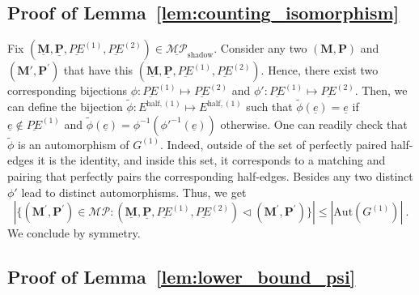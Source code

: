 \documentclass{article}
\begin{document}
\subsection{Proof of Lemma~\ref{lem:counting_isomorphism}}
    Fix  $(\underline{\mathbf{M}}, \underline{\mathbf{P}}, \underline{PE}^{(1)},\underline{PE}^{(2)})\in \underline{\mathcal{M}\mathcal{P}}_{\mathrm{shadow}}$. Consider any two $(\mathbf{M},\mathbf{P})$ and $(\mathbf{M}',\mathbf{P}^{'})$ that have this $(\underline{\mathbf{M}}, \underline{\mathbf{P}}, \underline{PE}^{(1)},\underline{PE}^{(2)})$. 
    Hence, there exist two corresponding bijections $\phi:\underline{PE}^{(1)}\mapsto \underline{PE}^{(2)} $ and $\phi':\underline{PE}^{(1)}\mapsto \underline{PE}^{(2)}$. Then, we can define the bijection $\tilde{\phi}: E^{\mathrm{\mathrm{half}},(1)}\mapsto E^{\mathrm{\mathrm{half}},(1)}$  such that $\tilde{\phi}(\underline{e})= \underline{e}$ if $\underline{e}\notin \underline{PE}^{(1)}$ and $\tilde{\phi}(\underline{e})= \phi^{-1}(\phi'^{-1}(\underline{e}))$ otherwise. One can readily check that $\tilde{\phi}$ is an automorphism of $G^{(1)}$. Indeed, outside of the set of perfectly paired half-edges it is the identity, and inside this set, it corresponds to a matching and pairing that perfectly pairs the corresponding half-edges. 
    Besides any two distinct $\phi'$ lead to distinct automorphisms. Thus, we get
    \[
        \left|\Big\{(\mathbf{M}^{'},\mathbf{P}^{'})\in \mathcal{M}\mathcal{P} :  (\underline{\mathbf{M}}, \underline{\mathbf{P}}, \underline{PE}^{(1)},\underline{PE}^{(2)})\triangleleft  (\mathbf{M}^{'},\mathbf{P}^{'}) \Big\}\right|\leq |\mathrm{Aut}(G^{(1)})| \ . 
    \]
    We conclude by symmetry. 
    




\subsection{Proof of Lemma~\ref{lem:lower_bound_psi}}
\end{document}
